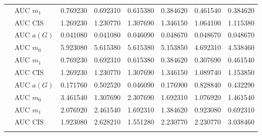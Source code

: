 \begin{table}[htbp]
\begin{tabular}{llrrrrrr}
    & AUC $m_1$ & 0.769230 & 0.692310 & 0.615380 & 0.384620 & 0.461540 & 0.384620 \\
    & AUC CIS & 1.269230 & 1.230770 & 1.307690 & 1.346150 & 1.064100 & 1.115380 \\
    \addlinespace
    \multirow{4}{*}{degree} & AUC $a(G)$ & 0.041080 & 0.041080 & 0.046090 & 0.048670 & 0.048670 & 0.048670 \\
    & AUC $m_0$ & 5.923080 & 5.615380 & 5.615380 & 5.153850 & 4.692310 & 4.538460 \\
    & AUC $m_1$ & 0.769230 & 0.692310 & 0.615380 & 0.384620 & 0.307690 & 0.461540 \\
    & AUC CIS & 1.269230 & 1.230770 & 1.307690 & 1.346150 & 1.089740 & 1.153850 \\
    \addlinespace
    \multirow{4}{*}{random} & AUC $a(G)$ & 0.171760 & 0.502520 & 0.046090 & 0.176900 & 0.828840 & 0.432290 \\
    & AUC $m_0$ & 3.461540 & 1.307690 & 2.307690 & 1.692310 & 1.076920 & 1.461540 \\
    & AUC $m_1$ & 2.076920 & 2.461540 & 1.692310 & 1.384620 & 0.923080 & 0.692310 \\
    & AUC CIS & 1.923080 & 2.628210 & 1.551280 & 2.230770 & 2.230770 & 3.038460 \\
    \addlinespace
    \bottomrule
  \end{tabular}
\end{table}

